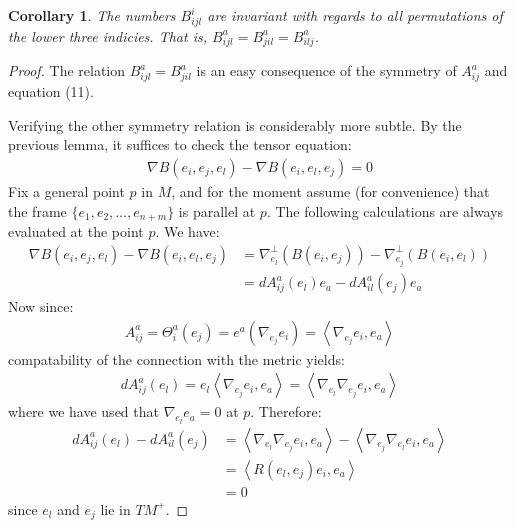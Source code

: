\documentclass[11pt]{amsart}
\newtheorem{cor}[subsection]{Corollary}
\def \la { \left\langle }
\def \ra { \right\rangle }
\theoremstyle{definition}
\begin{document}
\begin{cor}  The numbers $B^i_{ijl}$ are invariant with regards to all permutations of the lower three indicies.  That is, $B^a_{ijl} = B^a_{jil} = B^a_{ilj}$. 
\end{cor}  
%
\begin{proof} The relation $B^a_{ijl} = B^a_{jil}$ is an easy consequence of the symmetry of $A^a_{ij}$ and equation (11). 

Verifying the other symmetry relation is considerably more subtle.  By the previous lemma, it suffices to check the tensor equation:
%
\begin{align*}
\nabla B (e_i, e_j, e_l) - \nabla B (e_i, e_l, e_j ) = 0
\end{align*}
%
Fix a general point $p$ in $M$, and for the moment assume (for convenience) that the frame $\{ e_1, e_2, \ldots, e_{n+m} \}$ is parallel at $p$.  The following calculations are always evaluated at the point $p$.  We have:
%
\begin{align*}
\nabla B (e_i, e_j, e_l) - \nabla B (e_i, e_l, e_j ) &= \nabla^{\perp}_{e_l}( B(e_i, e_j) ) - \nabla^{\perp}_{e_j}( B(e_i, e_l) )\\
&= d A^a_{ij} (e_l) e_a - d A^a_{il} (e_j) e_a
\end{align*}
%
Now since:
%
\begin{align*}
A^a_{ij} = \Theta^a_i (e_j) = e^a( \nabla_{e_j} e_i ) = \la \nabla_{e_j} e_i, e_a \ra
\end{align*}
%
compatability of the connection with the metric yields:
%
\begin{align*}
d A^a_{ij} (e_l) = e_l \la \nabla_{e_j} e_i, e_a \ra = \la \nabla_{e_l} \nabla_{e_j} e_i, e_a \ra
\end{align*}
%
where we have used that $\nabla_{e_l} e_{a} = 0$ at $p$.  Therefore:
%
\begin{align*}
d A^a_{ij} (e_l) - d A^a_{il} (e_j) &= \la \nabla_{e_l} \nabla_{e_j} e_i, e_a \ra - \la \nabla_{e_j} \nabla_{e_l} e_i, e_a \ra \\
&= \la R(e_l, e_j) e_i, e_a \ra \\
&= 0
\end{align*}
%
since $e_l$ and $e_j$ lie in $TM^{+}$.
%
\end{proof}
\end{document}

